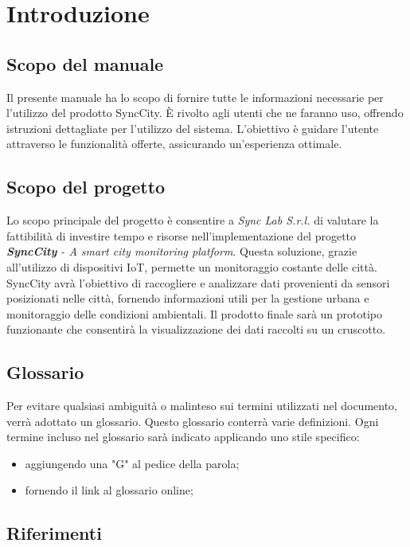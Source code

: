\section{Introduzione}
\setcounter{subsection}{0}
\subsection{Scopo del manuale} %
Il presente manuale ha lo scopo di fornire tutte le informazioni necessarie per l’utilizzo del prodotto SyncCity. È rivolto agli utenti che ne faranno uso, offrendo istruzioni dettagliate per l’utilizzo del sistema. L’obiettivo è guidare l’utente attraverso le funzionalità offerte, assicurando un’esperienza ottimale.

\subsection{Scopo del progetto}
Lo scopo principale del progetto è consentire a \textit{Sync Lab S.r.l.} di valutare la fattibilità di investire tempo e risorse nell’implementazione del progetto \textit{\textbf{SyncCity} - A smart city monitoring platform}. Questa soluzione, grazie all’utilizzo di dispositivi IoT, permette un monitoraggio costante delle città. SyncCity avrà l’obiettivo di raccogliere e analizzare dati provenienti da sensori posizionati nelle città, fornendo informazioni utili per la gestione urbana e monitoraggio delle condizioni ambientali. Il prodotto finale sarà un prototipo funzionante che consentirà la visualizzazione dei dati raccolti su un cruscotto.

\subsection{Glossario}
Per evitare qualsiasi ambiguità o malinteso sui termini utilizzati nel documento, verrà adottato un glossario. Questo glossario conterrà varie definizioni. Ogni termine incluso nel glossario sarà indicato applicando uno stile specifico:
\begin{itemize}
    \item aggiungendo una "G" al pedice della parola;
    \item fornendo il link al glossario online;
\end{itemize}

\subsection{Riferimenti}
